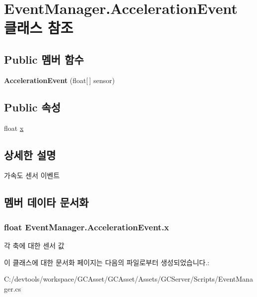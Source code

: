 \hypertarget{class_event_manager_1_1_acceleration_event}{}\section{Event\+Manager.\+Acceleration\+Event 클래스 참조}
\label{class_event_manager_1_1_acceleration_event}
\subsection*{Public 멤버 함수}
\begin{DoxyCompactItemize}
\item 
\hypertarget{class_event_manager_1_1_acceleration_event_ad18230460e27b3d1a3fb9ffb2d8d8618}{}{\bfseries Acceleration\+Event} (float\mbox{[}$\,$\mbox{]} sensor)\label{class_event_manager_1_1_acceleration_event_ad18230460e27b3d1a3fb9ffb2d8d8618}

\end{DoxyCompactItemize}
\subsection*{Public 속성}
\begin{DoxyCompactItemize}
\item 
float \hyperlink{class_event_manager_1_1_acceleration_event_afdd30cea9eb3291ff85f059a8ec52969}{x}
\end{DoxyCompactItemize}


\subsection{상세한 설명}
가속도 센서 이벤트 

\subsection{멤버 데이타 문서화}
\hypertarget{class_event_manager_1_1_acceleration_event_afdd30cea9eb3291ff85f059a8ec52969}{}
\subsubsection[{x}]{\setlength{\rightskip}{0pt plus 5cm}float Event\+Manager.\+Acceleration\+Event.\+x}\label{class_event_manager_1_1_acceleration_event_afdd30cea9eb3291ff85f059a8ec52969}
각 축에 대한 센서 값 

이 클래스에 대한 문서화 페이지는 다음의 파일로부터 생성되었습니다.\+:\begin{DoxyCompactItemize}
\item 
C\+:/devtools/workspace/\+G\+C\+Asset/\+G\+C\+Asset/\+Assets/\+G\+C\+Server/\+Scripts/Event\+Manager.\+cs\end{DoxyCompactItemize}
